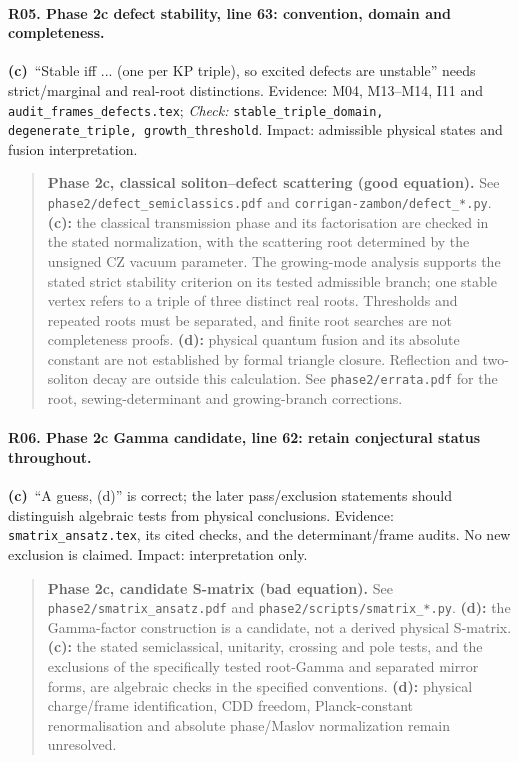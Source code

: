 \documentclass[11pt,a4paper]{article}
\newcommand{\C}{\textbf{(c)}\ }
\newcommand{\file}[1]{\nolinkurl{#1}}
\newcommand{\test}[1]{\textit{Check:} \file{#1}.}
\begin{document}
\paragraph{R05. Phase 2c defect stability, line 63: convention, domain and completeness.}
\C ``Stable iff ... (one per KP triple), so excited defects are unstable''
needs strict/marginal and real-root distinctions. Evidence: M04, M13--M14,
I11 and \file{audit_frames_defects.tex};
\test{stable_triple_domain, degenerate_triple, growth_threshold}
Impact: admissible physical states and fusion interpretation.
\begin{quote}
\textbf{Phase 2c, classical soliton--defect scattering (good equation).}
See \file{phase2/defect_semiclassics.pdf} and
\file{corrigan-zambon/defect_*.py}. \textbf{(c):} the classical transmission
phase and its factorisation are checked in the stated normalization,
with the scattering root determined by the unsigned CZ vacuum parameter.
The growing-mode analysis supports the stated strict stability criterion
on its tested admissible branch; one stable vertex refers to a triple
of three distinct real roots. Thresholds and repeated roots must be
separated, and finite root searches are not completeness proofs.
\textbf{(d):} physical quantum fusion and its absolute constant are not
established by formal triangle closure. Reflection and two-soliton decay
are outside this calculation. See \file{phase2/errata.pdf} for the root,
sewing-determinant and growing-branch corrections.
\end{quote}

\paragraph{R06. Phase 2c Gamma candidate, line 62: retain conjectural status throughout.}
\C ``A guess, (d)'' is correct; the later pass/exclusion statements should
distinguish algebraic tests from physical conclusions. Evidence:
\file{smatrix_ansatz.tex}, its cited checks, and the determinant/frame audits.
No new exclusion is claimed. Impact: interpretation only.
\begin{quote}
\textbf{Phase 2c, candidate S-matrix (bad equation).} See
\file{phase2/smatrix_ansatz.pdf} and \file{phase2/scripts/smatrix_*.py}.
\textbf{(d):} the Gamma-factor construction is a candidate, not a derived
physical S-matrix. \textbf{(c):} the stated semiclassical, unitarity,
crossing and pole tests, and the exclusions of the specifically tested
root-Gamma and separated mirror forms, are algebraic checks in the
specified conventions. \textbf{(d):} physical charge/frame identification,
CDD freedom, Planck-constant renormalisation and absolute phase/Maslov
normalization remain unresolved.
\end{quote}
\end{document}
